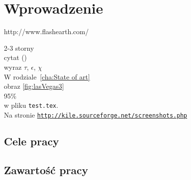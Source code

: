 \chapter{Wprowadzenie}
\label{cha:wprowadzenie}

http://www.flashearth.com/

2-3 storny\\
cytat (\cite{JsonXmlComp})\\
wyraz $\tau$, $\epsilon$, $\chi$\\
W rodziale~\ref{cha:State of art}\\
obraz \ref{fig:lasVegas3}\\
95\%\\
w pliku \texttt{test.tex}.\\
Na stronie \underline{\texttt{http://kile.sourceforge.net/screenshots.php}}\\

\section{Cele pracy}
\label{sec:celePracy}


\section{Zawartość pracy}
\label{sec:zawartoscPracy}



















